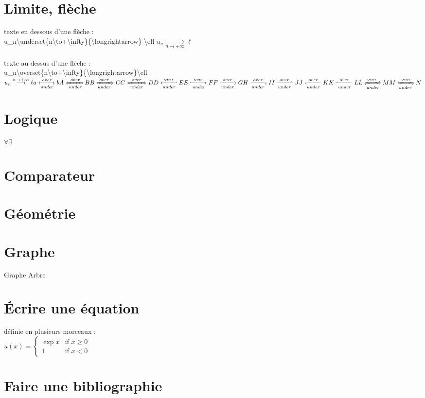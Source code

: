 \documentclass{article}
\begin{document}
\section{Limite, flèche}
texte en dessous d'une flèche :\\
u\_n\textbackslash underset\{n\textbackslash to+\textbackslash infty\}\{\textbackslash longrightarrow\} \textbackslash ell  $u_n\underset{n\to+\infty}{\longrightarrow}\ell$\\
    \\
    texte au dessus d'une flèche :\\
    u\_n\textbackslash overset\{n\textbackslash to+\textbackslash infty\}\{\textbackslash longrightarrow\}\textbackslash ell
$u_n\overset{n\to+\infty}{\longrightarrow}\ell\\
a \xleftrightarrow[under]{over} b\\
A \xLeftarrow[under]{over} B\\
B \xRightarrow[under]{over} C\\
%
C \xLeftrightarrow[under]{over} D\\
%
D \xhookleftarrow[under]{over} E\\
%
E \xhookrightarrow[under]{over} F\\
%
F \xmapsto[under]{over} G\\
%
H \xrightharpoondown[under]{over} I\\
%
I \xrightharpoonup[under]{over} J\\
%
J \xleftharpoondown[under]{over} K\\
%
K \xleftharpoonup[under]{over} L\\
%
L \xrightleftharpoons[under]{over} M\\
%
M \xleftrightharpoons[under]{over} N
$
\section{Logique}
$\forall
\exists$

\section{Comparateur}

\section{Géométrie}

\section{Graphe}
Graphe
Arbre


\section{\'Ecrire une équation}
définie en plusieurs morceaux :\\
$
u(x) =
\begin{cases}
\exp{x} & \text{if } x \geq 0 \\
1 & \text{if } x < 0
\end{cases}
$
\section{Faire une bibliographie}
\end{document}
